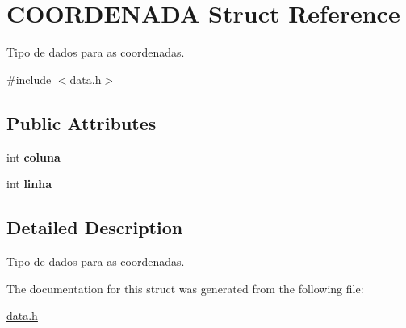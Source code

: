 \hypertarget{structCOORDENADA}{}\section{C\+O\+O\+R\+D\+E\+N\+A\+DA Struct Reference}
\label{structCOORDENADA}


Tipo de dados para as coordenadas.  




{\ttfamily \#include $<$data.\+h$>$}

\subsection*{Public Attributes}
\begin{DoxyCompactItemize}
\item 
\mbox{\label{structCOORDENADA_adfbc8d4856ce807139fdf62e00aed29a}} 
int {\bfseries coluna}
\item 
\mbox{\label{structCOORDENADA_aefe14bcc5a066ac3b21500cc3d28c06f}} 
int {\bfseries linha}
\end{DoxyCompactItemize}


\subsection{Detailed Description}
Tipo de dados para as coordenadas. 

The documentation for this struct was generated from the following file\+:\begin{DoxyCompactItemize}
\item 
\hyperlink{data_8h}{data.\+h}\end{DoxyCompactItemize}
